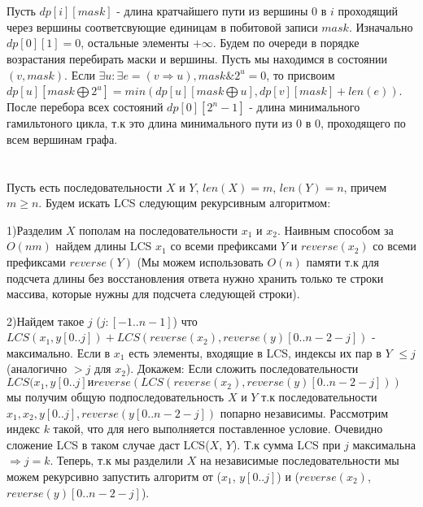 \documentclass{article}
\begin{document}
\begin{flushleft}
\section{}

Пусть $dp[i][mask]$ - длина кратчайшего пути из вершины 0 в $i$ проходящий через вершины соответсвующие единицам в побитовой записи $mask$. Изначально $dp[0][1] = 0$, остальные элементы $+\infty$. Будем по очереди в порядке возрастания перебирать маски и вершины. Пусть мы находимся в состоянии $(v, mask)$. Если $\exists u: \exists e = (v \Rightarrow u), mask \& 2^u = 0$, то присвоим $dp[u][mask \bigoplus 2^u] = min(dp[u][mask \bigoplus u], dp[v][mask] + len(e))$. После перебора всех состояний $dp[0][2^n - 1]$ - длина минимального гамильтоного цикла, т.к это длина минимального пути из 0 в 0, проходящего по всем вершинам графа.

\section{}

Пусть есть последовательности $X$ и $Y$, $len(X) = m$, $len(Y) = n$, причем $m \ge n$. Будем искать LCS следующим рекурсивным алгоритмом: 

1)Разделим $X$ пополам на последовательности $x_1$ и $x_2$. Наивным способом за $O(nm)$ найдем длины LCS $x_1$ со всеми префиксами $Y$ и $reverse(x_2)$ со всеми префиксами $reverse(Y)$ (Мы можем использовать $O(n)$ памяти т.к для подсчета длины без восстановления ответа нужно хранить только те строки массива, которые нужны для подсчета следующей строки). 

2)Найдем такое $j$ ($j : [-1.. n - 1]$) что $LCS(x_1, y[0..j]) + LCS(reverse(x_2), reverse(y)[0.. n - 2 - j])$ - максимально. Если в $x_1$ есть элементы, входящие в LCS, индексы их пар в $Y$ $\le j$ (аналогично $> j$ для $x_2$). Докажем: Если сложить последовательности $LCS(x_1, y[0..j] и reverse(LCS(reverse(x_2), reverse(y)[0.. n - 2 - j]))$ мы получим общую подпоследовательность $X$ и $Y$ т.к последовательности $x_1, x_2, y[0..j], reverse(y[0.. n - 2 - j])$ попарно независимы. Рассмотрим индекс $k$ такой, что для него выполняется поставленное условие. Очевидно сложение LCS в таком случае даст LCS($X$, $Y$). Т.к сумма LCS при $j$ максимальна $\Rightarrow j = k$. Теперь, т.к мы разделили $X$ на независимые последовательности мы можем рекурсивно запустить алгоритм от ($x_1$, $y[0..j]$) и ($reverse(x_2)$, $reverse(y)[0.. n - 2 - j]$).


\end{flushleft}
\end{document}
